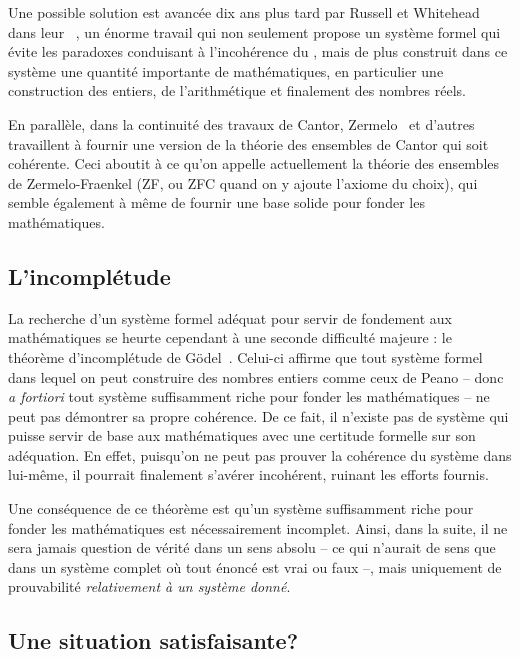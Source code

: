 Une possible solution est avancée dix ans plus tard
par Russell et Whitehead dans leur ~,
un énorme travail qui non seulement propose un système
formel qui évite les paradoxes conduisant à l’incohérence du
, mais de plus construit dans ce système une quantité importante
de mathématiques, en particulier une construction des entiers, de l’arithmétique et
finalement des nombres réels.

En parallèle, dans la continuité des travaux de Cantor,
Zermelo~ et
d’autres travaillent à fournir une version de la théorie des ensembles de Cantor
qui soit cohérente. Ceci aboutit à ce qu’on appelle actuellement la
théorie des ensembles de Zermelo-Fraenkel (ZF, ou ZFC quand on y ajoute l’axiome
du choix), qui semble également à même de fournir une base solide pour fonder les
mathématiques.

\subsection{L’incomplétude}

La recherche d’un système formel adéquat pour servir de fondement aux mathématiques 
se heurte cependant à une seconde difficulté majeure : le théorème d’incomplétude de
Gödel~. Celui-ci affirme que tout système formel
dans lequel on peut construire des nombres entiers comme ceux de Peano – donc
\textit{a fortiori} tout système suffisamment riche pour fonder les mathématiques –
ne peut pas démontrer sa propre cohérence. De ce fait, il n’existe pas de
système qui puisse servir de base aux mathématiques
avec une certitude formelle sur son adéquation.
En effet, puisqu’on ne peut pas prouver la cohérence du
système dans lui-même, il pourrait finalement s’avérer incohérent, ruinant les
efforts fournis.

Une conséquence de ce théorème est qu’un système suffisamment riche
pour fonder les mathématiques est nécessairement incomplet.%
Ainsi, dans la suite, il ne sera jamais question de vérité dans un sens absolu –
ce qui n’aurait de sens que dans un système complet
où tout énoncé est vrai ou faux –, mais
uniquement de prouvabilité \emph{relativement à un système donné}.

\subsection{Une situation satisfaisante?}

